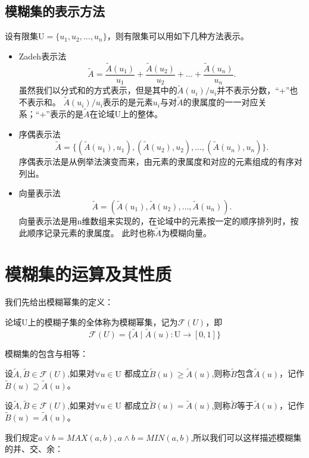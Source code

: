 \subsection{模糊集的表示方法}
设有限集$\mathrm{U}=\{u_1,u_2,\dots ,u_n\}$，则有限集可以用如下几种方法表示\cite{模糊数学李安贵}。
\begin{itemize}
    \item Zadeh表示法
          \[
              \tilde{A}=\frac{\tilde{A}(u_1)}{u_1}+\frac{\tilde{A}(u_2)}{u_2}+ \dots +\frac{\tilde{A}(u_n)}{u_n}.
          \]
          虽然我们以分式和的方式表示，但是其中的$\tilde{A}(u_i)/u_i$并不表示分数，“+”也不表示和。
          $\tilde{A}(u_i)/u_i$表示的是元素$u_i$与对$\tilde{A}$的隶属度的一一对应关系；“+”表示的是$\tilde{A}$在论域$\mathrm{U}$上的整体。\newpage
    \item 序偶表示法
          \[
              \tilde{A}=\{(\tilde{A}(u_1),u_1),(\tilde{A}(u_2),u_2),\dots ,(\tilde{A}(u_n),u_n)\}.
          \]
          序偶表示法是从例举法演变而来，由元素的隶属度和对应的元素组成的有序对列出。
    \item 向量表示法
          \[
              \tilde{A}=(\tilde{A}(u_1),\tilde{A}(u_2),\dots ,\tilde{A}(u_n)).
          \]
          向量表示法是用n维数组来实现的，在论域中的元素按一定的顺序排列时，按此顺序记录元素的隶属度。
          此时也称$\tilde{A}$为模糊向量。
\end{itemize}
\section{模糊集的运算及其性质}
我们先给出模糊幂集的定义：
\begin{definition}
    论域$\mathrm{U}$上的模糊子集的全体称为模糊幂集，记为$\mathscr{F}(U)$，即
    \[
        \mathscr{F}(U)=\{\tilde{A} \mid \tilde{A}(u):\mathrm{U} \to [0,1]\}
    \]
\end{definition}
模糊集的包含与相等：
\begin{definition}
    设$\tilde{A}, \tilde{B} \in \mathscr{F}(U)$,如果对$\forall u \in \mathrm{U}$
    都成立$\tilde{B}(u)\geqslant \tilde{A}(u)$,则称$\tilde{B}$包含$\tilde{A}(u)$，记作$\tilde{B}(u )\supseteq \tilde{A}(u)$。
\end{definition}
\begin{definition}
    设$\tilde{A}, \tilde{B} \in \mathscr{F}(U)$,如果对$\forall u \in \mathrm{U}$
    都成立$\tilde{B}(u) = \tilde{A}(u)$,则称$\tilde{B}$等于$\tilde{A}(u)$，记作$\tilde{B}(u)= \tilde{A}(u)$。
\end{definition}
我们规定$a\vee b=MAX(a,b),a\wedge b=MIN(a,b)$,所以我们可以这样描述模糊集的并、交、余：


